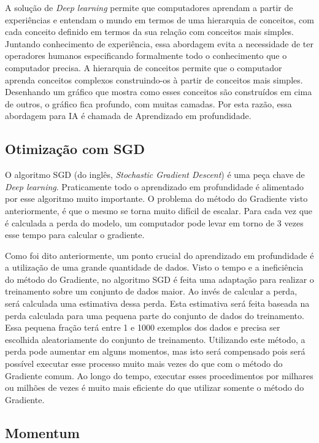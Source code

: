 A solução de \textit{Deep learning} permite que computadores aprendam
a partir de experiências e entendam o mundo em termos de uma
hierarquia de conceitos, com cada conceito definido em termos da sua
relação com conceitos mais simples. Juntando conhecimento de
experiência, essa abordagem evita a necessidade de ter operadores
humanos especificando formalmente todo o conhecimento que o computador
precisa. A hierarquia de conceitos permite que o computador aprenda
conceitos complexos construindo-os à partir de conceitos mais
simples. Desenhando um gráfico que mostra como esses conceitos são
construídos em cima de outros, o gráfico fica profundo, com muitas
camadas. Por esta razão, essa abordagem para IA é chamada de
Aprendizado em profundidade\cite{Goodfellow-et-al-2016-Book}.

\subsection{Otimização com SGD}

O algoritmo SGD (do inglês, \textit{Stochastic Gradient Descent}) é
uma peça chave de \textit{Deep learning}. Praticamente todo o
aprendizado em profundidade é alimentado por esse algoritmo muito
importante. O problema do método do Gradiente visto anteriormente, é
que o mesmo se torna muito difícil de escalar. Para cada vez que é
calculada a perda do modelo, um computador pode levar em torno de 3
vezes esse tempo para calcular o gradiente.

Como foi dito anteriormente, um ponto crucial do aprendizado em
profundidade é a utilização de uma grande quantidade de dados. Visto o
tempo e a ineficiência do método do Gradiente, no algoritmo SGD é
feita uma adaptação para realizar o treinamento sobre um conjunto de
dados maior. Ao invés de calcular a perda, será calculada uma
estimativa dessa perda. Esta estimativa será feita baseada na perda
calculada para uma pequena parte do conjunto de dados do
treinamento. Essa pequena fração terá entre 1 e 1000 exemplos dos
dados e precisa ser escolhida aleatoriamente do conjunto de
treinamento. Utilizando este método, a perda pode aumentar em alguns
momentos, mas isto será compensado pois será possível executar esse
processo muito mais vezes do que com o método do Gradiente
comum. Ao longo do tempo, executar esses procedimentos por milhares ou
milhões de vezes é muito mais eficiente do que utilizar somente o
método do Gradiente.

\subsection{Momentum}

